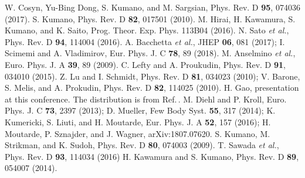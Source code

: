 \documentclass{PoS}
\begin{document}
\begin{thebibliography}{99}
\vspace{-0.20cm}
 W. Cosyn, Yu-Bing Dong, S. Kumano, and M. Sargsian,
                          Phys. Rev. D {\bf 95}, 074036 (2017). 
\vspace{-0.20cm}
 S. Kumano, Phys. Rev. D {\bf 82}, 017501 (2010). 
\vspace{-0.20cm}
    M. Hirai, H. Kawamura, S. Kumano, and K. Saito, 
    Prog. Theor. Exp. Phys. 113B04 (2016). 
\vspace{-0.20cm}
 N. Sato {\it et al.}, 
                       Phys. Rev. D {\bf 94}, 114004 (2016).
\vspace{-0.20cm}
 A. Bacchetta {\it et al.}, 
                       JHEP {\bf 06}, 081 (2017);
          I. Scimemi and A. Vladimirov,
                       Eur. Phys. J. C {\bf 78}, 89 (2018).
\vspace{-0.20cm}
 M. Anselmino {\it et al.}, 
                          Euro. Phys. J. A {\bf 39}, 89 (2009).
\vspace{-0.20cm}
 C. Lefty and A. Proukudin,
                          Phys. Rev. D {\bf 91}, 034010 (2015).
\vspace{-0.20cm}
 Z. Lu and I. Schmidt, Phys. Rev. D {\bf 81}, 034023 (2010);
       V. Barone, S. Melis, and A. Prokudin, 
                         Phys. Rev. D {\bf 82}, 114025 (2010).
\vspace{-0.20cm}
 H. Gao, presentation at this conference.
                    The distribution is from Ref.\,\cite{tmd-pretz}.
\vspace{-0.20cm}
  M. Diehl and P. Kroll,
                Euro. Phys. J. C {\bf 73}, 2397 (2013);
         D. Mueller, Few Body Syst. {\bf 55},  317 (2014); 
	     K. Kumericki, S. Liuti, and H. Moutarde,
                Eur. Phys. J. A {\bf 52}, 157 (2016);
         H. Moutarde, P. Sznajder, and J. Wagner,
                arXiv:1807.07620.
\vspace{-0.20cm}
S. Kumano, M. Strikman, and K. Sudoh,
                          Phys. Rev. D {\bf 80}, 074003 (2009).
T. Sawada {\it et al.}, 
    Phys. Rev. D {\bf 93}, 114034 (2016) 
\vspace{-0.20cm}   
  H. Kawamura and S. Kumano, Phys. Rev. D {\bf 89}, 054007 (2014).
\vspace{-0.20cm}

\end{thebibliography}
\end{document}

